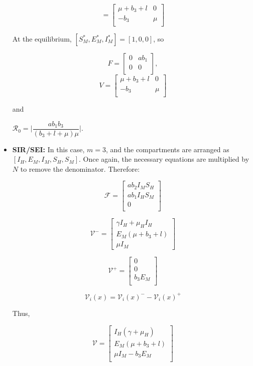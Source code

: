 \documentclass[a4paper,fleqn]{cas-dc}
\begin{document}
\begin{itemize}
$$
=\begin{bmatrix}
\mu+b_3+l & 0\\
- b_3 & \mu\\
\end{bmatrix}$$

At the equilibrium, $[S_M^*, E_M^*, I_M^*] = [1,0,0]$, so 

$$F=\begin{bmatrix}
0 & ab_1\\
0 & 0\\
\end{bmatrix},$$
$$V = \begin{bmatrix}
\mu+b_3+l & 0\\
- b_3 & \mu\\
\end{bmatrix}$$ 

and 

$\mathcal{R}_0 = \Big | \dfrac{ab_1b_3}{(b_3+l+\mu)\mu}\Big | $.

\item \textbf{SIR/SEI:}
In this case, $m=3$, and the compartments are arranged as $[I_H, E_M, I_M, S_H, S_M]$. Once again, the necessary equations are multiplied by $N$ to remove the denominator. Therefore:

$$ {\mathcal F} =\begin{bmatrix}
a  b_2  I_M  S_H \\
a b_1 I_H S_M\\
0\\
\end{bmatrix} $$

$$
{\mathcal V^-} = \begin{bmatrix}
\gamma I_H +\mu_H I_H\\
E_M (\mu + b_3 + l)\\
\mu I_M
\end{bmatrix}
$$

$$
{\mathcal V^+} = \begin{bmatrix}
0\\
0\\
b_3 E_M \\
\end{bmatrix}
$$

$${\mathcal V}_i (x) = {\mathcal V}_i(x)^{-} - {\mathcal V}_i(x)^+$$

Thus,

$$
{\mathcal V} =
\begin{bmatrix}
I_H (\gamma + \mu_H) \\
E_M (\mu + b_3 + l)\\
\mu I_M - b_3 E_M\\
\end{bmatrix}
$$


\end{itemize}
\end{document}
